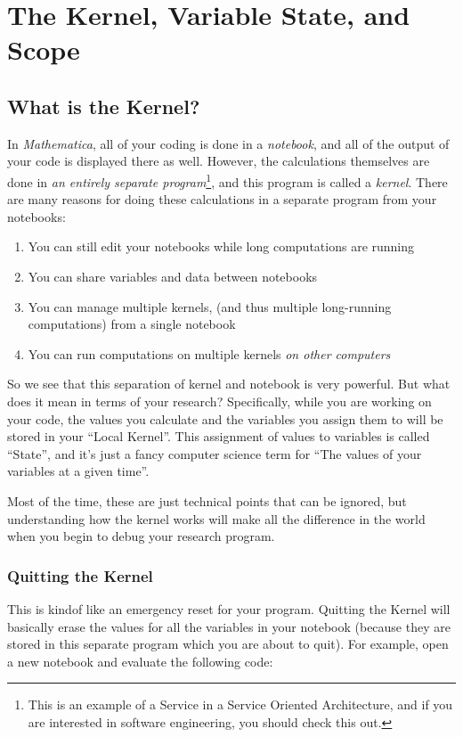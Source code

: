 \chapter[Kernel, State, Scope]{The Kernel, Variable State, and Scope}
\label{chap:Kernel}

\section{What is the Kernel?}

In \emph{Mathematica}, all of your coding is done in a \emph{notebook}, and all of the output of your code is displayed there as well. However, the calculations themselves are done in \emph{an entirely separate program}\footnote{This is an example of a Service in a Service Oriented Architecture, and if you are interested in software engineering, you should check this out.}, and this program is called a \emph{kernel}. There are many reasons for doing these calculations in a separate program from your notebooks:

\begin{enumerate}
	   \item You can still edit your notebooks while long computations are running
	   \item You can share variables and data between notebooks
	   \item You can manage multiple kernels, (and thus multiple long-running computations) from a single notebook
	   \item You can run computations on multiple kernels \emph{on other computers}
\end{enumerate}

So we see that this separation of kernel and notebook is very powerful. But what does it mean in terms of your research? Specifically, while you are working on your code, the values you calculate and the variables you assign them to will be stored in your ``Local Kernel''. This assignment of values to variables is called ``State'', and it's just a fancy computer science term for ``The values of your variables at a given time''.

Most of the time, these are just technical points that can be ignored, but understanding how the kernel works will make all the difference in the world when you begin to debug your research program.

\subsection{Quitting the Kernel} This is kindof like an emergency reset for your program. Quitting the Kernel will basically erase the values for all the variables in your notebook (because they are stored in this separate program which you are about to quit). For example, open a new notebook and evaluate the following code:

